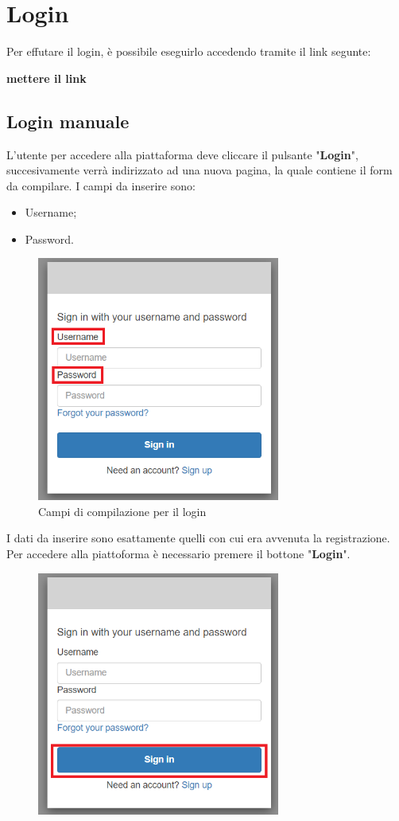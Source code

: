 \section{Login} {
    Per effutare il login, è possibile eseguirlo accedendo tramite il link segunte: 
    \begin{center}
        \textbf{mettere il link}
    \end{center}
    \subsection{Login manuale} {
        L'utente per accedere alla piattaforma deve cliccare il pulsante "\textbf{Login}", succesivamente verrà indirizzato ad una nuova pagina, 
        la quale contiene il form da compilare. I campi da inserire sono: 
        \begin{itemize}
            \item Username;
            \item Password.
        \end{itemize}
        \begin{figure}[H]
            \includegraphics[width=8cm]{sezioni/images/form-log.png}
            \centering
            \caption{Campi di compilazione per il login}
        \end{figure}
        I dati da inserire sono esattamente quelli con cui era avvenuta la registrazione. \aCapo
        Per accedere alla piattoforma è necessario premere il bottone "\textbf{Login}". 
        \begin{figure}[H]
            \includegraphics[width=8cm]{sezioni/images/conf-log.png}

\end{figure}}}

